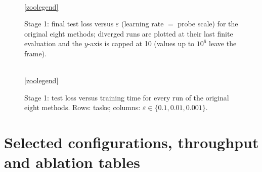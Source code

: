 \documentclass{article}
\newcommand{\method}[1]{\textsc{#1}}
\newcommand{\FF}{\method{ff}}
\begin{document}
\begin{table}[ht]
  \caption{Tied $\varepsilon$ screening of every (task, method) pair: the lowest
  validation loss over the hour at each value (\FF{} on the image tasks: goodness
  validation accuracy), with the selected value in bold. Values at
  $\varepsilon\le10^{-4}$ come from one-hour runs under the stage-2 settings; the first
  three columns are stage-1 runs where no stage-2 run exists. Every selected value has a worse neighbour on each side except at a grid edge
  ($10^{-5}$ for four image-task pairs, $0.1$ for \FF{} on MNIST).}
  \label{tab:eps}
  \centering
  \scriptsize
  \setlength{\tabcolsep}{4pt}
  \resizebox{\linewidth}{!}{}
\end{table}

\begin{table}[ht]
  \caption{Stage 1: final validation / test loss of all 96 runs of the original eight
  methods (seed 0, 5-minute evaluations). Bold: the $\varepsilon$ with the lowest
  \emph{final} validation loss. A dagger marks a diverged run (last finite evaluation
  shown). Initial validation losses: 2.744 (MNIST), 2.395 (CIFAR-10), 3.911 (LSTM),
  4.497 (Transformer).}
  \label{tab:grid}
  \centering
  \footnotesize
  \setlength{\tabcolsep}{4pt}
  
\end{table}

\begin{figure}[ht]
  \centering
  
  \\[0.5ex]
  \ref{zoolegend}
  \caption{Stage 1: final test loss versus $\varepsilon$ (learning rate $=$ probe
  scale) for the original eight methods; diverged runs are plotted at their last finite
  evaluation and the $y$-axis is capped at 10 (values up to $10^{6}$ leave the frame).}
  \label{fig:eps}
\end{figure}

\begin{figure}[ht]
  \centering
  
  \\[0.5ex]
  \ref{zoolegend}
  \caption{Stage 1: test loss versus training time for every run of the original eight
  methods. Rows: tasks; columns: $\varepsilon\in\{0.1,0.01,0.001\}$.}
  \label{fig:curves-all}
\end{figure}

\section{Selected configurations, throughput and ablation tables}
\label{app:selected}
\end{document}
